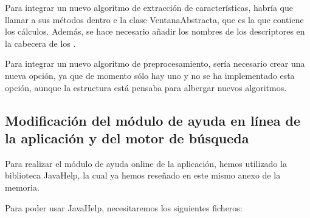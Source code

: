 Para integrar un nuevo algoritmo de extracción de características, habría que llamar a sus métodos dentro e la clase VentanaAbstracta, que es la que contiene los cálculos. Además, se hace necesario añadir los nombres de los descriptores en la cabecera de los \arff{}.

Para integrar un nuevo algoritmo de preprocesamiento, sería necesario crear una nueva opción, ya que de momento sólo hay uno y no se ha implementado esta opción, aunque la estructura está pensaba para albergar nuevos algoritmos.

\subsection{Modificación del módulo de ayuda en línea de la aplicación y del motor de búsqueda}
Para realizar el módulo de ayuda online de la aplicación, hemos utilizado la biblioteca JavaHelp, la cual ya hemos reseñado en este mismo anexo de la memoria.

Para poder usar JavaHelp, necesitaremos los siguientes ficheros:

